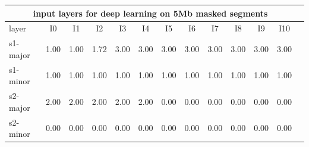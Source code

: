 \documentclass{standalone}
\begin{document}
\begin{tabular}{|l|c|c|c|c|c|c|c|c|c|c|c|c|}
\hline
\multicolumn{12}{|c|}{\textbf{input layers for deep learning on 5Mb masked segments}}\\
\hline 

layer & I0 & I1 & I2 & I3 & I4 & I5 & I6 & I7 & I8 & I9 & I10 \\
\hline
s1-major & 1.00 & 1.00 & 1.72 & 3.00 & 3.00 & 3.00 & 3.00 & 3.00 & 3.00 & 3.00 & 3.00 \\
s1-minor & 1.00 & 1.00 & 1.00 & 1.00 & 1.00 & 1.00 & 1.00 & 1.00 & 1.00 & 1.00 & 1.00 \\
s2-major & 2.00 & 2.00 & 2.00 & 2.00 & 2.00 & 0.00 & 0.00 & 0.00 & 0.00 & 0.00 & 0.00 \\
s2-minor & 0.00 & 0.00 & 0.00 & 0.00 & 0.00 & 0.00 & 0.00 & 0.00 & 0.00 & 0.00 & 0.00 \\
\hline
\end{tabular}
\end{document}
